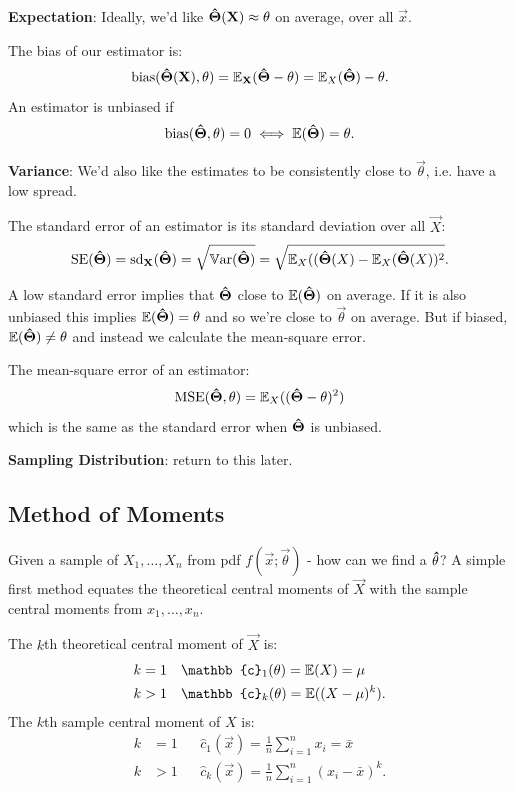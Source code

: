 \documentclass[10pt, a4paper]{article}
\begin{document}
\textbf{Expectation}:
Ideally,
we'd like $\mathbf{\hat{\Theta}}(\mathbf{X}) \approx \mathbf{\theta}$ on average,
over all $\vec{x}$.

\begin{definition}
    The bias of our estimator is:
    \[
    \operatorname{bias}(\mathbf{\hat{\Theta}}(\mathbf{X}), \mathbf{\theta}) = \mathbb{E}_{\mathbf{X}}(\mathbf{\hat{\Theta}} - \mathbf{\theta}) = \mathbb{E}_{X}(\mathbf{\hat{\Theta}}) - \mathbf{\theta}.
    \]
    An estimator is unbiased if
    \[
    \operatorname{bias}(\mathbf{\hat{\Theta}}, \mathbf{\theta}) = 0 \iff \mathbb{E}(\mathbf{\hat{\Theta}}) = \mathbf{\theta}.
    \]
\end{definition}

\textbf{Variance}:
We'd also like the estimates to be consistently close to $\vec{\theta}$,
i.e. have a low spread.

\begin{definition}
    The standard error of an estimator is its standard deviation over all $\vec{X}$:
    \[
    \mathrm{SE}(\mathbf{\hat{\Theta}}) = \mathrm{sd}_{\mathbf{X}}(\mathbf{\hat{\Theta}}) = \sqrt{\mathbb{V}\mathrm{ar}(\mathbf{\hat{\Theta}})} = \sqrt{\mathbb{E}_{X}((\mathbf{\hat{\Theta}}(X) - \mathbb{E}_{X}(\mathbf{\hat{\Theta}}(X)) ^ 2}.
    \]
\end{definition}

A low standard error implies that $\mathbf{\hat{\Theta}}$ close to $\mathbb{E}(\mathbf{\hat{\Theta}})$ on average.
If it is also unbiased this implies $\mathbb{E}(\mathbf{\hat{\Theta}}) = \theta$ and so we're close to $\vec{\theta}$ on average.
But if biased,
$\mathbb{E}(\mathbf{\hat{\Theta}}) \neq \mathbf{\theta}$ and instead we calculate the mean-square error.

\begin{definition}
    The mean-square error of an estimator:
    \[
    \mathrm{MSE}(\mathbf{\hat{\Theta}}, \mathbf{\theta}) = \mathbb{E}_{X}((\mathbf{\hat{\Theta}} - \mathbf{\theta}) ^ 2)
    \]
    which is the same as the standard error when $\mathbf{\hat{\Theta}}$ is unbiased.
\end{definition}

\textbf{Sampling Distribution}:
return to this later.

\subsection{Method of Moments}
Given a sample of $X_1, \dotsc, X_n$ from pdf $f(\vec{x}; \vec{\theta})$ -
how can we find a $\mathbf{\hat{\theta}}$?
A simple first method equates the theoretical central moments of $\vec{X}$ with the sample central moments from $x_1, \dotsc, x_n$.

\begin{definition}
    The $k$th theoretical central moment of $\vec{X}$ is:
    \begin{align*}
        k &= 1&&\mathbb{c}_1(\vec{\theta}) = \E(X) = \mu \\
        k &> 1&&\mathbb{c}_{k}(\vec{\theta}) = \E((X - \mu) ^ k).
    \end{align*}
    The $k$th sample central moment of $X$ is:
    \begin{align*}
        k &= 1&&\hat{c}_1(\vec{x}) = \frac{1}{n}\sum_{i = 1}^{n}x_i = \bar{x} \\
        k &> 1&&\hat{c}_k(\vec{x}) = \frac{1}{n}\sum_{i = 1}^{n}(x_i - \bar{x}) ^ k.
    \end{align*}
\end{definition}
\end{document}
